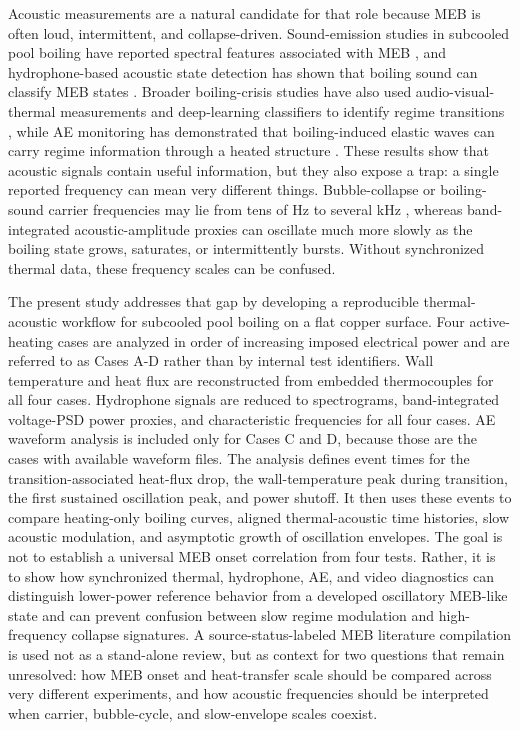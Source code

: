 \documentclass[final,1p,times]{elsarticle}
\begin{document}
Acoustic measurements are a natural candidate for that role because MEB is often loud, intermittent, and collapse-driven. Sound-emission studies in subcooled pool boiling have reported spectral features associated with MEB \citep{tang_2018_sound_emission_subcooled_pool}, and hydrophone-based acoustic state detection has shown that boiling sound can classify MEB states \citep{ono_2023_acoustic_state_detection_meb,ueki_2024_acoustic_state_cucrzr_divertor}. Broader boiling-crisis studies have also used audio-visual-thermal measurements and deep-learning classifiers to identify regime transitions \citep{sinha_2020_audio_visual_thermal_transition,sinha_2021_deep_learning_sound_boiling}, while AE monitoring has demonstrated that boiling-induced elastic waves can carry regime information through a heated structure \citep{baek_2017_ae_water_boiling_cladding}. These results show that acoustic signals contain useful information, but they also expose a trap: a single reported frequency can mean very different things. Bubble-collapse or boiling-sound carrier frequencies may lie from tens of Hz to several kHz \citep{tang_2016_transition_to_meb,zhu_2014_visualized_meb,horiuchi_2021_spatial_temporal_thermal_fluid,kobayashi_2022_on_homogeneity_of_vapor_bubble}, whereas band-integrated acoustic-amplitude proxies can oscillate much more slowly as the boiling state grows, saturates, or intermittently bursts. Without synchronized thermal data, these frequency scales can be confused.

The present study addresses that gap by developing a reproducible thermal-acoustic workflow for subcooled pool boiling on a flat copper surface. Four active-heating cases are analyzed in order of increasing imposed electrical power and are referred to as Cases A-D rather than by internal test identifiers. Wall temperature and heat flux are reconstructed from embedded thermocouples for all four cases. Hydrophone signals are reduced to spectrograms, band-integrated voltage-PSD power proxies, and characteristic frequencies for all four cases. AE waveform analysis is included only for Cases C and D, because those are the cases with available waveform files. The analysis defines event times for the transition-associated heat-flux drop, the wall-temperature peak during transition, the first sustained oscillation peak, and power shutoff. It then uses these events to compare heating-only boiling curves, aligned thermal-acoustic time histories, slow acoustic modulation, and asymptotic growth of oscillation envelopes. The goal is not to establish a universal MEB onset correlation from four tests. Rather, it is to show how synchronized thermal, hydrophone, AE, and video diagnostics can distinguish lower-power reference behavior from a developed oscillatory MEB-like state and can prevent confusion between slow regime modulation and high-frequency collapse signatures. A source-status-labeled MEB literature compilation is used not as a stand-alone review, but as context for two questions that remain unresolved: how MEB onset and heat-transfer scale should be compared across very different experiments, and how acoustic frequencies should be interpreted when carrier, bubble-cycle, and slow-envelope scales coexist.
\end{document}
